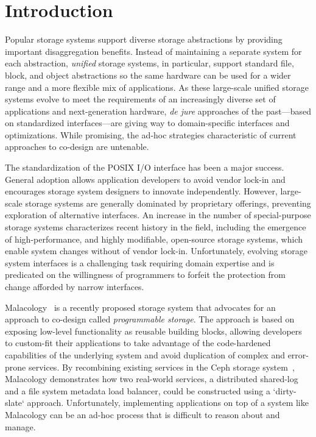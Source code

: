 \section{Introduction}
\label{sec:intro}

Popular storage systems support diverse storage abstractions by
providing important disaggregation benefits. Instead of maintaining
a separate system for each abstraction, \emph{unified} storage
systems, in particular, support standard file, block, and object abstractions so the same
hardware can be used for a wider range and a more flexible mix of applications. 
As these large-scale unified storage systems evolve to meet the requirements 
of an increasingly diverse set of applications and next-generation hardware, \emph{de jure}
approaches of the past---based on standardized interfaces---are giving way to
domain-specific interfaces and optimizations. While promising, the ad-hoc strategies characteristic of 
current approaches to co-design are untenable.

The standardization of the POSIX I/O interface has been a major success. General adoption
allows application developers to avoid vendor lock-in and encourages storage system
designers to innovate independently. However, large-scale storage systems are generally dominated 
by proprietary offerings, preventing exploration of alternative
interfaces. An increase in the number of special-purpose storage systems characterizes recent history
in the field, including the emergence of high-performance, and highly modifiable, open-source storage systems, 
which enable system changes without of vendor lock-in. Unfortunately, evolving storage system
interfaces is a challenging task requiring domain expertise and is predicated on the willingness of
programmers to forfeit the protection from change afforded by narrow
interfaces.

Malacology~\cite{sevilla:eurosys17} is a recently proposed storage system that
advocates for an approach to co-design called \emph{programmable storage}. The
approach is based on exposing low-level functionality as reusable building
blocks, allowing developers to custom-fit their applications to take advantage
of the code-hardened capabilities of the underlying system and avoid
duplication of complex and error-prone services. By recombining existing
services in the Ceph storage system~\cite{weil:osdi2006-ceph}, Malacology demonstrates how two
real-world services, a distributed shared-log and a file system metadata load
balancer, could be constructed using a `dirty-slate` approach. Unfortunately, implementing
applications on top of a system like Malacology can be an ad-hoc process
that is difficult to reason about and manage.

